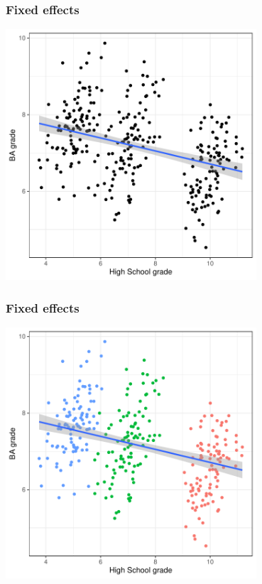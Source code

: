 \documentclass[aspectratio=43]{beamer}
\begin{document}
\begin{frame}
\frametitle{Fixed effects}
\centering

\includegraphics[width = 0.7\textwidth]{../img/fe2}

\end{frame}

\begin{frame}
\frametitle{Fixed effects}
\centering

\includegraphics[width = 0.7\textwidth]{../img/fe3}

\end{frame}
\end{document}
